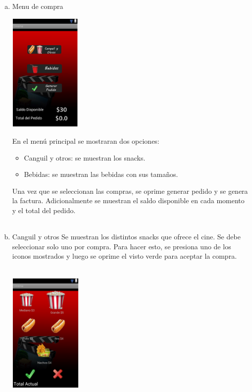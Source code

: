 \documentclass[20pt]{article}
\begin{document}
\begin{enumerate}[(a)]
\item Menu de compra\\
\begin{center}
	\includegraphics[totalheight=1.8in,width=1.4in]{menu_de_compra}
\end{center}

En el menú principal se mostraran dos opciones: 
\begin{itemize}
\item Canguil y otros: se muestran los snacks. 
\item Bebidas: se muestran las bebidas con sus tamaños.
\end{itemize}

Una vez que se seleccionan las compras, se oprime generar pedido y se genera la factura. Adicionalmente se muestran el saldo disponible en cada momento y el total del pedido.\\\\

\item Canguil y otros
Se muestran los distintos snacks que ofrece el cine. Se debe seleccionar solo uno por compra. Para hacer esto, se presiona uno de los iconos mostrados y luego se oprime el visto verde para aceptar la compra.\\\\
\begin{center}
	\includegraphics[totalheight=1.8in,width=1.4in]{canguil_y_otros}
\end{center}


\end{enumerate}
\end{document}
